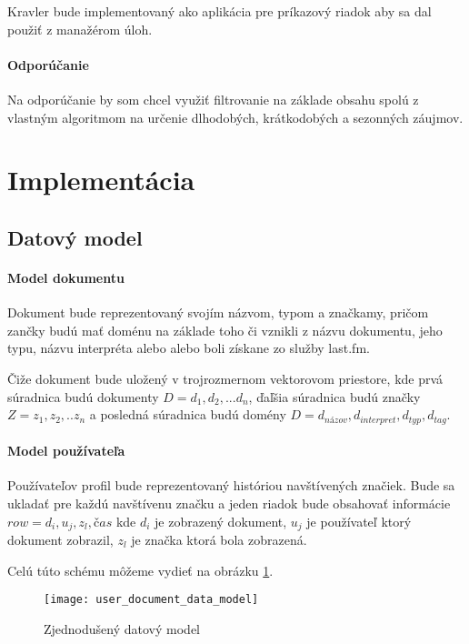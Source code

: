 Kravler bude implementovaný ako aplikácia pre príkazový riadok
aby sa dal použiť z manažérom úloh.

\paragraph{Odporúčanie}

Na odporúčanie by som chcel využiť filtrovanie na základe obsahu
spolú z vlastným algoritmom na určenie dlhodobých, krátkodobých a
sezonných záujmov.

\section{Implementácia}

\subsection{Datový model}

\paragraph{Model dokumentu}

Dokument bude reprezentovaný svojím názvom, typom a značkamy,
pričom zančky budú mať doménu na základe toho či vznikli
z názvu dokumentu, jeho typu, názvu interpréta alebo alebo
boli získane zo služby last.fm.

Čiže dokument bude uložený v trojrozmernom vektorovom priestore,
kde prvá súradnica budú dokumenty \(D = {d_1, d_2,... d_n}\),
ďaľšia súradnica budú značky \(Z = {z_1, z_2,.. z_n}\) a posledná 
súradnica budú domény \(D = {d_{názov}, d_{interpret}, d_{typ}, d_{tag}}\).

\paragraph{Model používateľa}

Používateľov profil bude reprezentovaný históriou navštívených značiek.
Bude sa ukladať pre každú navštívenu značku a jeden riadok bude obsahovať 
informácie \(row = {d_i, u_j, z_l, čas}\) kde \(d_i\) je zobrazený dokument,
\(u_j\) je používateľ ktorý dokument zobrazil, \(z_l\) je značka ktorá bola zobrazená.

Celú túto schému môžeme vydieť na obrázku \ref{fig:user_document_data_model}.


\begin{figure}
    \begin{center}
        \texttt{[image: user\_document\_data\_model]}
        \caption{Zjednodušený datový model}
        \label{fig:user_document_data_model}
    \end{center}
\end{figure}

